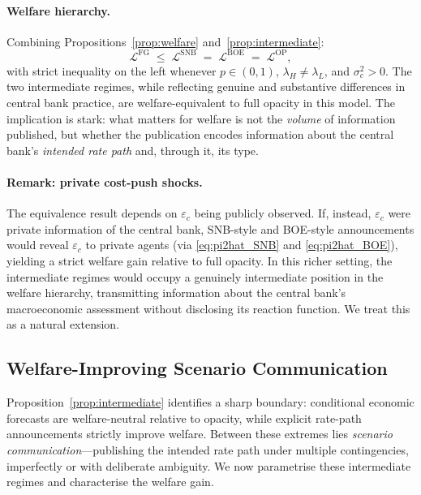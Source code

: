 \paragraph{Welfare hierarchy.}
Combining Propositions~\ref{prop:welfare} and~\ref{prop:intermediate}:
\begin{equation}
  \mathcal{L}^{\mathrm{FG}}
  \;\leq\;
  \mathcal{L}^{\mathrm{SNB}}
  \;=\;
  \mathcal{L}^{\mathrm{BOE}}
  \;=\;
  \mathcal{L}^{\mathrm{OP}},
  \label{eq:welfare_hierarchy}
\end{equation}
with strict inequality on the left whenever $p \in (0,1)$, $\lambda_H \neq
\lambda_L$, and $\sigma_c^2 > 0$. The two intermediate regimes, while reflecting
genuine and substantive differences in central bank practice, are
welfare-equivalent to full opacity in this model. The implication is stark: what
matters for welfare is not the \emph{volume} of information published, but whether
the publication encodes information about the central bank's \emph{intended rate
path} and, through it, its type.

\paragraph{Remark: private cost-push shocks.}
The equivalence result depends on $\varepsilon_c$ being publicly observed. If,
instead, $\varepsilon_c$ were private information of the central bank, SNB-style and
BOE-style announcements would reveal $\varepsilon_c$ to private agents (via
\eqref{eq:pi2hat_SNB} and \eqref{eq:pi2hat_BOE}), yielding a strict welfare gain
relative to full opacity. In this richer setting, the intermediate regimes would
occupy a genuinely intermediate position in the welfare hierarchy, transmitting
information about the central bank's macroeconomic assessment without disclosing its
reaction function. We treat this as a natural extension.

\subsection{Welfare-Improving Scenario Communication}
\label{sec:scenarios}

Proposition~\ref{prop:intermediate} identifies a sharp boundary: conditional
economic forecasts are welfare-neutral relative to opacity, while explicit rate-path
announcements strictly improve welfare. Between these extremes lies
\emph{scenario communication}---publishing the intended rate path under multiple
contingencies, imperfectly or with deliberate ambiguity. We now parametrise these
intermediate regimes and characterise the welfare gain.

